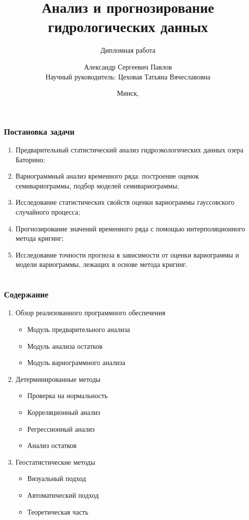 \documentclass[10pt,pdf,aspectratio=169,hyperref={unicode},notheorems]{beamer}
\title[Анализ и прогнозирование гидрологических данных]{Анализ и прогнозирование гидрологических данных}
\subtitle{Дипломная работа}
\author[Павлов А.С.]{Александр Сергеевич Павлов \\ \smallskip Научный руководитель: Цеховая Татьяна Вячеславовна}
\institute[БГУ, ФПМИ]{Факультет прикладной математики и информатики \\ \smallskip Кафедра теории вероятностей и математической статистики}
\date{Минск, \the\year}
\theoremstyle{definition}
\theoremstyle{example}
\theoremstyle{plain}
\begin{document}
\begin{frame}[plain]
  \titlepage
\end{frame}

\begin{frame}
  \frametitle{Постановка задачи}
  \begin{enumerate}
    \item Предварительный статистический анализ гидроэкологических данных озера Баторино;
    \item Вариограммный анализ временного ряда: построение оценок семивариограммы, подбор моделей семивариограммы;
    \item Исследование статистических свойств оценки вариограммы гауссовского случайного процесса;
    \item Прогнозирование значений временного ряда с помощью интерполяционного метода кригинг;
    \item Исследование точности прогноза в зависимости от оценки вариограммы и модели вариограммы, лежащих в основе метода кригинг.
  \end{enumerate}
\end{frame}

\section[Содержание]{}
\begin{frame}
  \frametitle{Содержание}
  \begin{enumerate}
    \item Обзор реализованного программного обеспечения
      \begin{itemize}
        \item Модуль предварительного анализа
        \item Модуль анализа остатков
        \item Модуль вариограммного анализа
      \end{itemize}
    \item Детерминированные методы
      \begin{itemize}
        \item Проверка на нормальность
        \item Корреляционный анализ
        \item Регрессионный анализ
        \item Анализ остатков
      \end{itemize}
    \item Геостатистические методы
      \begin{itemize}
        \item Визуальный подход
        \item Автоматический подход
        \item Теоретическая часть
      \end{itemize}
  \end{enumerate}
\end{frame}
\end{document}
